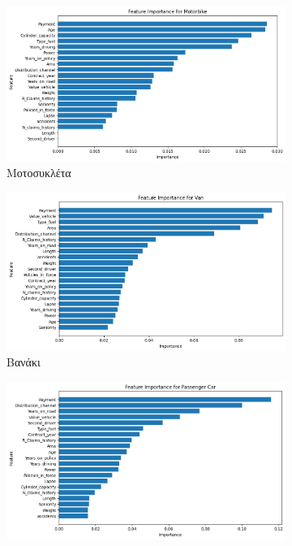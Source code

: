 \documentclass{llncs}
\begin{document}
\begin{figure}
    \centering
     \begin{subfigure}{0.45\linewidth}
      \includegraphics[width=\linewidth]{images/Motorbike_feature_importance_xgb.png}
      \caption{Μοτοσυκλέτα}
      \label{fig:subxgb1}
     \end{subfigure}
     \begin{subfigure}{0.45\linewidth}
      \includegraphics[width=\linewidth]{images/Van_feature_importance_xgb.png}
      \caption{Βανάκι}
      \label{fig:subxgb2}
      \end{subfigure}
  \vfill
       \begin{subfigure}{0.45\linewidth}
       \includegraphics[width=\linewidth]{images/Passenger Car_feature_importance_xgb.png}

\end{subfigure}
\end{figure}
\end{document}
